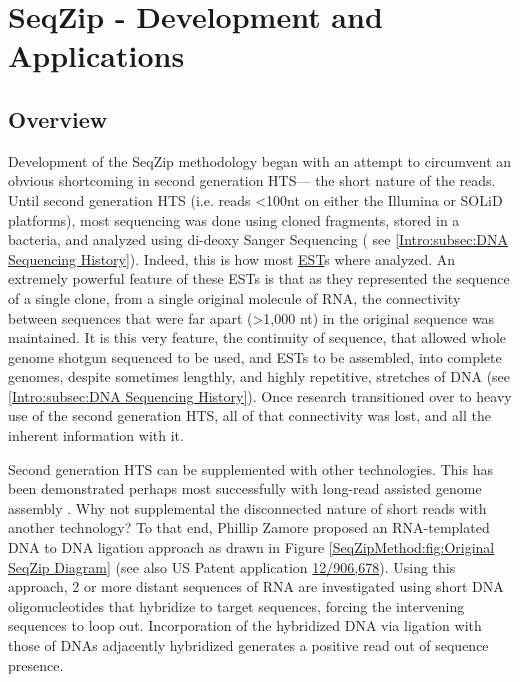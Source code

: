 \chapter{SeqZip - Development and Applications} 
\label{SeqZipMethod} 
\section{Overview}
  \label{SeqZipMethod:sec:SeqZip Overview}

  Development of the SeqZip methodology began with an attempt to circumvent an obvious shortcoming in second generation HTS--- the short nature of the reads. Until second generation HTS (i.e. reads <100nt on either the Illumina or SOLiD platforms), most sequencing was done using cloned fragments, stored in a bacteria, and analyzed using di-deoxy Sanger Sequencing ( see \ref{Intro:subsec:DNA Sequencing History}). Indeed, this is how most \hyperref[hd:abrevs]{EST}s where analyzed. An extremely powerful feature of these ESTs is that as they represented the sequence of a single clone, from a single original molecule of RNA, the connectivity between sequences that were far apart (>1,000 nt) in the original sequence was maintained. It is this very feature, the continuity of sequence, that allowed whole genome shotgun sequenced to be used, and ESTs to be assembled, into complete genomes, despite sometimes lengthly, and highly repetitive, stretches of DNA (see \ref{Intro:subsec:DNA Sequencing History}). Once research transitioned over to heavy use of the second generation HTS, all of that connectivity was lost, and all the inherent information with it.

  Second generation HTS can be supplemented with other technologies. This has been demonstrated perhaps most successfully with long-read assisted genome assembly \citep{Koren2012a}. Why not supplemental the disconnected nature of short reads with another technology? To that end, Phillip Zamore proposed an RNA-templated DNA to DNA ligation approach as drawn in Figure \ref{SeqZipMethod:fig:Original SeqZip Diagram} (see also US Patent application \href{http://1.usa.gov/PTG9BB}{12/906,678}). Using this approach, 2 or more distant sequences of RNA are investigated using short DNA oligonucleotides that hybridize to target sequences, forcing the intervening sequences to loop out. Incorporation of the hybridized DNA via ligation with those of DNAs adjacently hybridized generates a positive read out of sequence presence.

